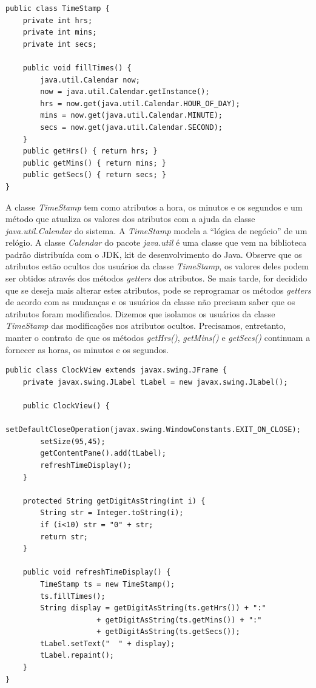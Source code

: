 \documentclass[
	11pt,				%
	openright,
	twoside,			%
	a4paper,			%
	english,			%
	french,
	brazil,				%
	sumario=tradicional
	]{abntex2}
\begin{document}
\begin{verbatim}
public class TimeStamp {
    private int hrs;
    private int mins;
    private int secs;
    
    public void fillTimes() {
        java.util.Calendar now;
        now = java.util.Calendar.getInstance();
        hrs = now.get(java.util.Calendar.HOUR_OF_DAY);
        mins = now.get(java.util.Calendar.MINUTE);
        secs = now.get(java.util.Calendar.SECOND);
    }
    public getHrs() { return hrs; }
    public getMins() { return mins; }
    public getSecs() { return secs; }
}
\end{verbatim}

A classe \emph{TimeStamp} tem como atributos a hora, os minutos e os segundos e um método que atualiza os valores dos atributos com a ajuda da classe \emph{java.util.Calendar} do sistema. A \emph{TimeStamp} modela a ``lógica de negócio'' de um relógio. A classe \emph{Calendar} do pacote \emph{java.util} é uma classe que vem na biblioteca padrão distribuída com o JDK, kit de desenvolvimento do Java. Observe que os atributos estão ocultos dos usuários da classe \emph{TimeStamp}, os valores deles podem ser obtidos através dos métodos \textit{getters} dos atributos. Se mais tarde, for decidido que se deseja mais alterar estes atributos, pode se reprogramar os métodos \textit{getters} de acordo com as mudanças e os usuários da classe não precisam saber que os atributos foram modificados. Dizemos que isolamos os usuários da classe \emph{TimeStamp} das modificações nos atributos ocultos. Precisamos, entretanto, manter o contrato de que os métodos \emph{getHrs()}, \emph{getMins()} e \emph{getSecs()} continuam a fornecer as horas, os minutos e os segundos.

\begin{verbatim}
public class ClockView extends javax.swing.JFrame {
    private javax.swing.JLabel tLabel = new javax.swing.JLabel();
    
    public ClockView() {
        setDefaultCloseOperation(javax.swing.WindowConstants.EXIT_ON_CLOSE);
        setSize(95,45);
        getContentPane().add(tLabel);
        refreshTimeDisplay();
    }
    
    protected String getDigitAsString(int i) {
        String str = Integer.toString(i);
        if (i<10) str = "0" + str;
        return str;
    }
    
    public void refreshTimeDisplay() {
        TimeStamp ts = new TimeStamp();
        ts.fillTimes();
        String display = getDigitAsString(ts.getHrs()) + ":"
                     + getDigitAsString(ts.getMins()) + ":"
                     + getDigitAsString(ts.getSecs());
        tLabel.setText("  " + display);
        tLabel.repaint();
    }
}
\end{verbatim}
\end{document}
